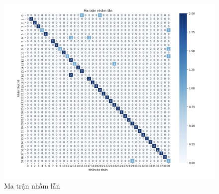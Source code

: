 \documentclass[a4paper,12pt]{extarticle}
\begin{document}
\begin{figure}[h]
    \centering
    \includegraphics[scale=0.7]{img/Matrannhamlan.png}
    \caption{Ma trận nhầm lẫn}
    \label{fig:enter-label}
\end{figure}
\end{document}
